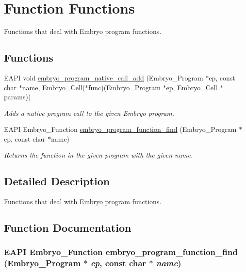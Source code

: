 \hypertarget{group__Embryo__Func__Group}{
\section{Function Functions}
\label{group__Embryo__Func__Group}
}
Functions that deal with Embryo program functions.  
\subsection*{Functions}
\begin{CompactItemize}
\item 
EAPI void \hyperlink{group__Embryo__Func__Group_g1164bbcc4dc623c54a1916f05499c9cb}{embryo\_\-program\_\-native\_\-call\_\-add} (Embryo\_\-Program $\ast$ep, const char $\ast$name, Embryo\_\-Cell($\ast$func)(Embryo\_\-Program $\ast$ep, Embryo\_\-Cell $\ast$params))
\begin{CompactList}\small\item\em Adds a native program call to the given Embryo program. \item\end{CompactList}\item 
EAPI Embryo\_\-Function \hyperlink{group__Embryo__Func__Group_g8da497a811da37c0396eeeb6b9331679}{embryo\_\-program\_\-function\_\-find} (Embryo\_\-Program $\ast$ep, const char $\ast$name)
\begin{CompactList}\small\item\em Returns the function in the given program with the given name. \item\end{CompactList}\end{CompactItemize}


\subsection{Detailed Description}
Functions that deal with Embryo program functions. 



\subsection{Function Documentation}
\hypertarget{group__Embryo__Func__Group_g8da497a811da37c0396eeeb6b9331679}{
\subsubsection{\setlength{\rightskip}{0pt plus 5cm}EAPI Embryo\_\-Function embryo\_\-program\_\-function\_\-find (Embryo\_\-Program $\ast$ {\em ep}, \/  const char $\ast$ {\em name})}}
\label{group__Embryo__Func__Group_g8da497a811da37c0396eeeb6b9331679}


